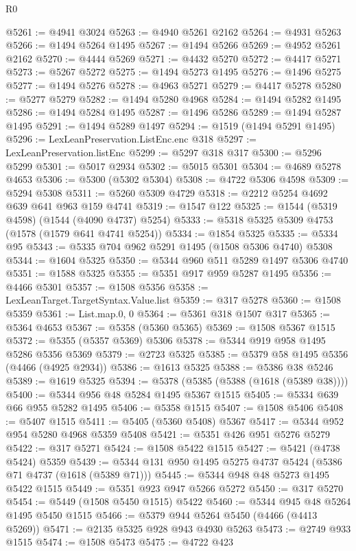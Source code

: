 \begin{lexlean}{R0}
\begin{coremodule}
@5261 := @4941 @3024
@5263 := @4940 @5261 @2162
@5264 := @4931 @5263
@5266 := @1494 @5264 @1495
@5267 := @1494 @5266
@5269 := @4952 @5261 @2162
@5270 := @4444 @5269
@5271 := @4432 @5270
@5272 := @4417 @5271
@5273 := @5267 @5272
@5275 := @1494 @5273 @1495
@5276 := @1496 @5275
@5277 := @1494 @5276
@5278 := @4963 @5271
@5279 := @4417 @5278
@5280 := @5277 @5279
@5282 := @1494 @5280 @4968
@5284 := @1494 @5282 @1495
@5286 := @1494 @5284 @1495
@5287 := @1496 @5286
@5289 := @1494 @5287 @1495
@5291 := @1494 @5289 @1497
@5294 := @1519 (@1494 @5291 @1495)
@5296 := LexLeanPreservation.ListEnc.enc @318
@5297 := LexLeanPreservation.listEnc
@5299 := @5297 @318 @317
@5300 := @5296 @5299
@5301 := @5017 @2934
@5302 := @5015 @5301
@5304 := @4689 @5278 @4653
@5306 := @5300 (@5302 @5304)
@5308 := @4722 @5306 @4598
@5309 := @5294 @5308
@5311 := @5260 @5309 @4729
@5318 := @2212 @5254 @4692 @639 @641 @963 @159 @4741
@5319 := @1547 @122
@5325 := @1544 (@5319 @4598) (@1544 (@4090 @4737) @5254)
@5333 := @5318 @5325 @5309 @4753 (@1578 (@1579 @641 @4741 @5254))
@5334 := @1854 @5325
@5335 := @5334 @95
@5343 := @5335 @704 @962 @5291 @1495 (@1508 @5306 @4740) @5308
@5344 := @1604 @5325
@5350 := @5344 @960 @511 @5289 @1497 @5306 @4740
@5351 := @1588 @5325
@5355 := @5351 @917 @959 @5287 @1495
@5356 := @4466 @5301
@5357 := @1508 @5356
@5358 := LexLeanTarget.TargetSyntax.Value.list
@5359 := @317 @5278
@5360 := @1508 @5359
@5361 := List.map.{0, 0}
@5364 := @5361 @318 @1507 @317
@5365 := @5364 @4653
@5367 := @5358 (@5360 @5365)
@5369 := @1508 @5367 @1515
@5372 := @5355 (@5357 @5369) @5306
@5378 := @5344 @919 @958 @1495 @5286 @5356 @5369
@5379 := @2723 @5325
@5385 := @5379 @58 @1495 @5356 (@4466 (@4925 @2934))
@5386 := @1613 @5325
@5388 := @5386 @38 @5246
@5389 := @1619 @5325
@5394 := @5378 (@5385 (@5388 (@1618 (@5389 @38))))
@5400 := @5344 @956 @48 @5284 @1495 @5367 @1515
@5405 := @5334 @639 @66 @955 @5282 @1495
@5406 := @5358 @1515
@5407 := @1508 @5406
@5408 := @5407 @1515
@5411 := @5405 (@5360 @5408) @5367
@5417 := @5344 @952 @954 @5280 @4968 @5359 @5408
@5421 := @5351 @426 @951 @5276 @5279
@5422 := @317 @5271
@5424 := @1508 @5422 @1515
@5427 := @5421 (@4738 @5424) @5359
@5439 := @5344 @131 @950 @1495 @5275 @4737 @5424 (@5386 @71 @4737 (@1618 (@5389 @71)))
@5445 := @5344 @948 @48 @5273 @1495 @5422 @1515
@5449 := @5351 @923 @947 @5266 @5272
@5450 := @317 @5270
@5454 := @5449 (@1508 @5450 @1515) @5422
@5460 := @5344 @945 @48 @5264 @1495 @5450 @1515
@5466 := @5379 @944 @5264 @5450 (@4466 (@4413 @5269))
@5471 := @2135 @5325 @928 @943 @4930 @5263
@5473 := @2749 @933 @1515
@5474 := @1508 @5473
@5475 := @4722 @423

\end{coremodule}
\end{lexlean}
